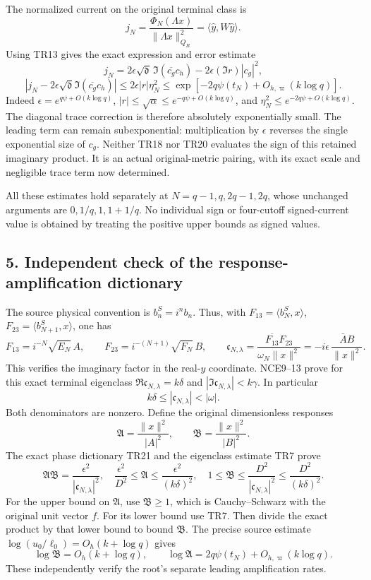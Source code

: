 \documentclass[10pt]{article}
\begin{document}
The normalized current on the original terminal class is \[
j_N=\frac{\Phi_N(\Lambda x)}{\|\Lambda x\|_{Q_B}^2}
=\langle\widehat y,W\widehat y\rangle.
\] Using TR13 gives the exact expression and error estimate \[
j_N=2\epsilon\sqrt{\mathfrak d}\,
\Im(\overline{c_g}c_h)-2\epsilon(\Im r)|c_g|^2,
\] \[
\boxed{\left|j_N-
2\epsilon\sqrt{\mathfrak d}\Im(\overline{c_g}c_h)\right|
\le2\epsilon|r|\eta_N^2
\le\exp[-2q\psi(t_N)+O_{h,\varpi}(k\log q)].}
\tag{TR20}
\] Indeed \(\epsilon=e^{q\psi+O(k\log q)}\), \(|r|\le\sqrt\alpha\le e^{-q\psi+O(k\log q)}\), and \(\eta_N^2\le e^{-2q\psi+O(k\log q)}\). The diagonal trace correction is therefore absolutely exponentially small. The leading term can remain subexponential: multiplication by \(\epsilon\) reverses the single exponential size of \(c_g\). Neither TR18 nor TR20 evaluates the sign of this retained imaginary product. It is an actual original-metric pairing, with its exact scale and negligible trace term now determined.

All these estimates hold separately at \(N=q-1,q,2q-1,2q\), whose unchanged arguments are \(0,1/q,1,1+1/q\). No individual sign or four-cutoff signed-current value is obtained by treating the positive upper bounds as signed values.

\subsection{5. Independent check of the response-amplification dictionary}\label{independent-check-of-the-response-amplification-dictionary}

The source physical convention is \(b_n^S=i^n b_n\). Thus, with \(F_{13}=\langle b_N^S,x\rangle\), \(F_{23}=\langle b_{N+1}^S,x\rangle\), one has \[
F_{13}=i^{-N}\sqrt{E_N}\,A,\qquad
F_{23}=i^{-(N+1)}\sqrt{F_N}\,B,\qquad
\mathfrak c_{N,\lambda}
=\frac{\overline{F_{13}}F_{23}}{\omega_N\|x\|^2}
=-i\epsilon\,\frac{\bar A B}{\|x\|^2}.
\tag{TR21}
\] This verifies the imaginary factor in the real-\(y\) coordinate. NCE9--13 prove for this exact terminal eigenclass \(\Re\mathfrak c_{N,\lambda}=k\delta\) and \(|\Im\mathfrak c_{N,\lambda}|<k\gamma\). In particular \[
k\delta\le|\mathfrak c_{N,\lambda}|<|\omega|.
\] Both denominators are nonzero. Define the original dimensionless responses \[
\mathfrak A=\frac{\|x\|^2}{|A|^2},\qquad
\mathfrak B=\frac{\|x\|^2}{|B|^2}.
\] The exact phase dictionary TR21 and the eigenclass estimate TR7 prove \[
\boxed{\mathfrak A\mathfrak B
=\frac{\epsilon^2}{|\mathfrak c_{N,\lambda}|^2},\quad
\frac{\epsilon^2}{D^2}\le\mathfrak A
\le\frac{\epsilon^2}{(k\delta)^2},\quad
1\le\mathfrak B\le\frac{D^2}{|\mathfrak c_{N,\lambda}|^2}
\le\frac{D^2}{(k\delta)^2}.}
\tag{TR22}
\] For the upper bound on \(\mathfrak A\), use \(\mathfrak B\ge1\), which is Cauchy--Schwarz with the original unit vector \(f\). For its lower bound use TR7. Then divide the exact product by that lower bound to bound \(\mathfrak B\). The precise source estimate \(\log(u_0/\ell_0)=O_h(k+\log q)\) gives \[
\log\mathfrak B=O_h(k+\log q),\qquad
\log\mathfrak A=2q\psi(t_N)+O_{h,\varpi}(k\log q).
\tag{TR23}
\] These independently verify the root's separate leading amplification rates.
\end{document}
